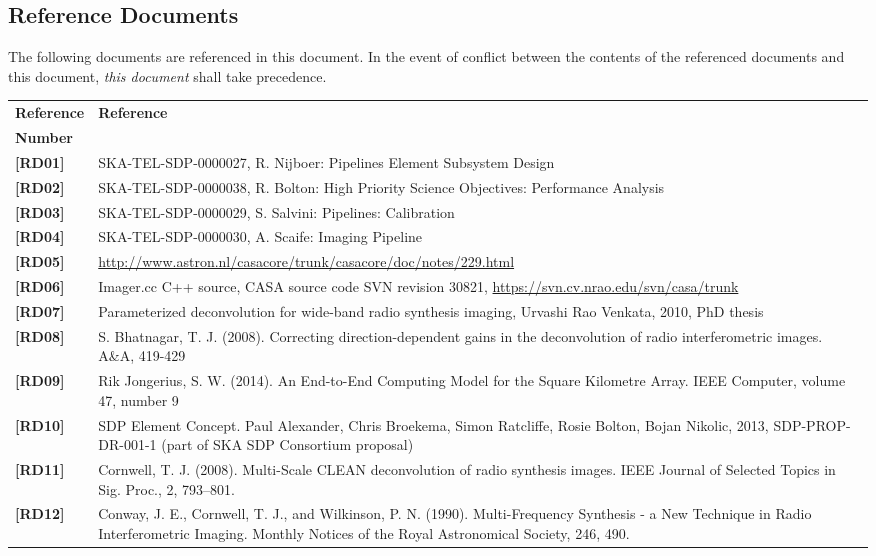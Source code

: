 \documentclass[11pt,a4paper,variablewidth]{article}
\begin{document}
\clearpage
\subsection*{Reference Documents}

The following documents are referenced in this document. In the event of
conflict between the contents of the referenced documents and this document,
\emph{this document} shall take precedence.

 \begin{center}
 \begin{tabularx}{\textwidth}{|l|X|}
     \hline
     \bf{Reference} & \bf{Reference}\\
     \bf{Number} & \\
     \hline
   {\bf [RD01]} & SKA-TEL-SDP-0000027, R. Nijboer: Pipelines Element Subsystem Design\\
   {\bf [RD02]} & SKA-TEL-SDP-0000038, R. Bolton: High Priority Science Objectives: Performance Analysis\\
   {\bf [RD03]} & SKA-TEL-SDP-0000029, S. Salvini: Pipelines: Calibration\\
   {\bf [RD04]} & SKA-TEL-SDP-0000030, A. Scaife: Imaging Pipeline\\
   {\bf [RD05]} & \url{http://www.astron.nl/casacore/trunk/casacore/doc/notes/229.html}\\
   {\bf [RD06]} & Imager.cc C++ source, CASA source code SVN revision 30821, \url{https://svn.cv.nrao.edu/svn/casa/trunk}\\ 
   {\bf [RD07]} & Parameterized deconvolution for wide-band radio synthesis imaging, Urvashi Rao Venkata, 2010, PhD thesis\\
   {\bf [RD08]} & S. Bhatnagar, T. J. (2008). Correcting direction-dependent gains in the deconvolution of radio interferometric images. A\&A, 419-429\\
   {\bf [RD09]} & Rik Jongerius, S. W. (2014). An End-to-End Computing Model for the Square Kilometre Array. IEEE Computer, volume 47, number 9\\
   {\bf [RD10]} & SDP Element Concept. Paul Alexander, Chris Broekema, Simon Ratcliffe, Rosie Bolton, Bojan Nikolic, 2013, SDP-PROP-DR-001-1 (part of SKA SDP Consortium proposal)\\
   {\bf [RD11]} & Cornwell, T. J. (2008). Multi-Scale CLEAN deconvolution of radio synthesis images. IEEE Journal of Selected Topics in Sig. Proc., 2, 793–801.\\
   {\bf [RD12]} & Conway, J. E., Cornwell, T. J., and Wilkinson, P. N. (1990). Multi-Frequency Synthesis - a New Technique in Radio Interferometric Imaging. Monthly Notices of the Royal Astronomical Society, 246, 490.\\

\end{tabularx}
\end{center}
\end{document}
